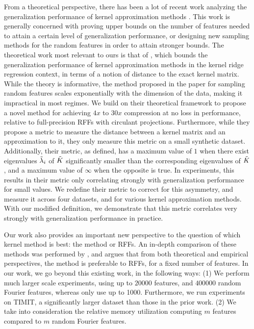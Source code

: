 From a theoretical perspective, there has been a lot of recent work analyzing the generalization performance of kernel approximation methods \citep{bach13,alaoui15,rudi15,optrff15,musco17,rudi17,bach17,avron17}. This work is generally concerned with proving upper bounds on the number of features needed to attain a certain level of generalization performance, or designing new sampling methods for the random features in order to attain stronger bounds. The theoretical work most relevant to ours is that of \citet{avron17}, which bounds the generalization performance of kernel approximation methods in the kernel ridge regression context, in terms of a notion of distance to the exact kernel matrix.  While the theory is informative, the method proposed in the paper for sampling random features scales exponentially with the dimension of the data, making it impractical in most regimes. We build on their theoretical framework to propose a novel method for achieving $4x$ to $30x$ compression at no loss in performance, relative to full-precision RFFs with circulant projections.  Furthermore, while they propose a metric to measure the distance between a kernel matrix and an approximation to it, they only measure this metric on a small synthetic dataset.  Additionally, their metric, as defined, has a maximum value of $1$ when there exist eigenvalues $\tilde{\lambda}_i$ of $\tilde{K}$ significantly smaller than the corresponding eigenvalues of $\tilde{K}$, and a maximum value of $\infty$ when the opposite is true. In experiments, this results in their metric only correlating strongly with generalization performance for small values.  We redefine their metric to correct for this asymmetry, and measure it across four datasets, and for various kernel approximation methods. With our modified definition, we demonstrate that this metric correlates very strongly with generalization performance in practice.

Our work also provides an important new perspective to the question of which kernel method is best: the \Nystrom method or RFFs. An in-depth comparison of these methods was performed by \citet{nysvsrff12}, and argues that from both theoretical and empirical perspectives, the \Nystrom method is preferable to RFFs, for a fixed number of features. In our work, we go beyond this existing work, in the following ways: (1) We perform much larger scale experiments, using up to $\num[group-separator={,}]{20000}$ \Nystrom features, and $\num[group-separator={,}]{400000}$ random Fourier features, whereas \citeauthor{nysvsrff12} only use up to 1000.  Furthermore,  we run experiments on TIMIT, a significantly larger dataset than those in the prior work. (2) We take into consideration the relative memory utilization computing $m$ \Nystrom features compared to $m$ random Fourier features.

